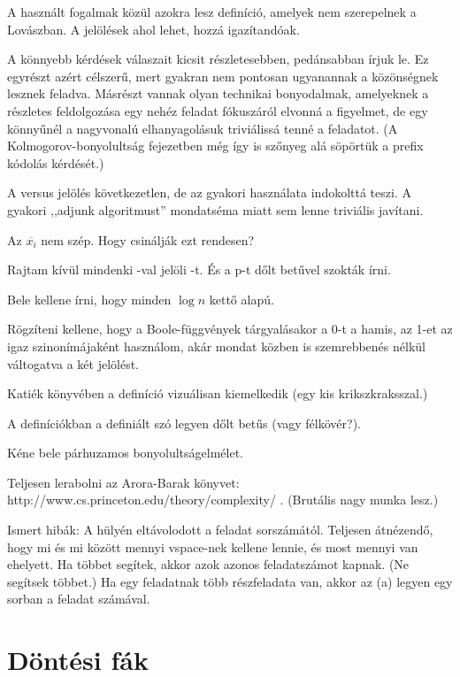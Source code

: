 A használt fogalmak közül azokra lesz definíció, amelyek nem szerepelnek a Lovászban. A jelölések ahol lehet, hozzá igazítandóak.

A könnyebb kérdések válaszait kicsit részletesebben, pedánsabban írjuk le. Ez egyrészt azért célszerű, mert gyakran nem pontosan ugyanannak a közönségnek lesznek feladva. Másrészt vannak olyan technikai bonyodalmak, amelyeknek a részletes feldolgozása egy nehéz feladat fókuszáról elvonná a figyelmet, de egy könnyűnél a nagyvonalú elhanyagolásuk triviálissá tenné a feladatot. (A Kolmogorov-bonyolultság fejezetben még így is szőnyeg alá söpörtük a prefix kódolás kérdését.)

A \LOGSPACE versus \NL jelölés következetlen, de az \Language gyakori használata indokolttá teszi. A gyakori ,,adjunk \LOGSPACE algoritmust'' mondatséma miatt sem lenne triviális javítani.

Az $\overline{x_i}$ nem szép. Hogy csinálják ezt rendesen?

Rajtam kívül mindenki {}-val jelöli \Sigmatwo-t. És a p-t dőlt betűvel szokták írni.

Bele kellene írni, hogy minden $\log n$ kettő alapú.

Rögzíteni kellene, hogy a Boole-függvények tárgyalásakor a 0-t a hamis, az 1-et az igaz szinonímájaként használom, akár mondat közben is szemrebbenés nélkül váltogatva a két jelölést.

Katiék könyvében a definíció vizuálisan kiemelkedik (egy kis krikszkraksszal.)

A definíciókban a definiált szó legyen dőlt betűs (vagy félkövér?).

Kéne bele párhuzamos bonyolultságelmélet.

Teljesen lerabolni az Arora-Barak könyvet: http://www.cs.princeton.edu/theory/complexity/ . (Brutális nagy munka lesz.)

Ismert hibák: A \hard hülyén eltávolodott a feladat sorszámától. Teljesen átnézendő, hogy mi és mi között mennyi vspace-nek kellene lennie, és most mennyi van ehelyett. Ha többet segítek, akkor azok azonos feladatszámot kapnak. (Ne segítsek többet.) Ha egy feladatnak több részfeladata van, akkor az (a) legyen egy sorban a feladat számával.



\chapter{Döntési fák}

